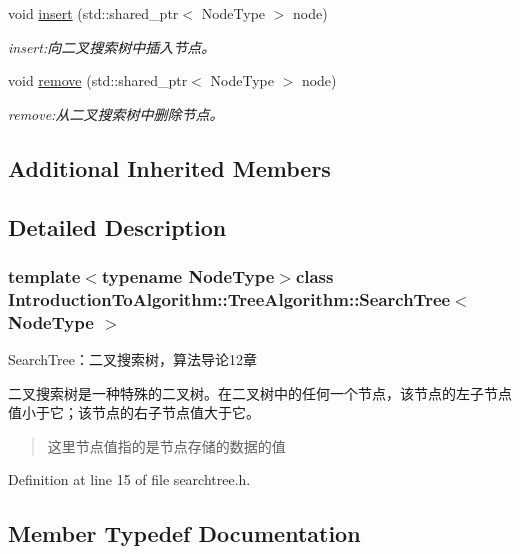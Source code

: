 \begin{DoxyCompactItemize}
void \hyperlink{class_introduction_to_algorithm_1_1_tree_algorithm_1_1_search_tree_a83724f0079d16419d4cceba74602cee1}{insert} (std\+::shared\+\_\+ptr$<$ Node\+Type $>$ node)
\begin{DoxyCompactList}\small\item\em insert\+:向二叉搜索树中插入节点。 \end{DoxyCompactList}\item 
void \hyperlink{class_introduction_to_algorithm_1_1_tree_algorithm_1_1_search_tree_a3b59a0c117766590f7f01027ad0fbfff}{remove} (std\+::shared\+\_\+ptr$<$ Node\+Type $>$ node)
\begin{DoxyCompactList}\small\item\em remove\+:从二叉搜索树中删除节点。 \end{DoxyCompactList}\end{DoxyCompactItemize}
\subsection*{Additional Inherited Members}


\subsection{Detailed Description}
\subsubsection*{template$<$typename Node\+Type$>$class Introduction\+To\+Algorithm\+::\+Tree\+Algorithm\+::\+Search\+Tree$<$ Node\+Type $>$}

Search\+Tree：二叉搜索树，算法导论12章 

二叉搜索树是一种特殊的二叉树。在二叉树中的任何一个节点，该节点的左子节点值小于它；该节点的右子节点值大于它。

\begin{quote}
这里节点值指的是节点存储的数据的值\end{quote}


Definition at line 15 of file searchtree.\+h.



\subsection{Member Typedef Documentation}
\hypertarget{class_introduction_to_algorithm_1_1_tree_algorithm_1_1_search_tree_a0a9b2de6326042f2a1fa8a3a0def67ab}{}
